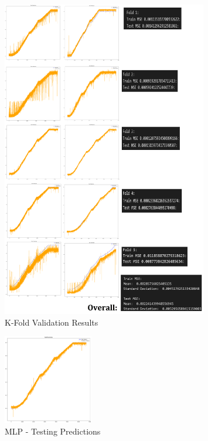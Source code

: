 \documentclass[conference]{IEEEtran}
\begin{document}
{        \begin{figure}[!h]
            \centering
            \includegraphics[width=0.8\textwidth]{../Data_Mining_Images/K_Fold_Results.png}
            \caption{K-Fold Validation Results} \label{fig_10}
        \end{figure}

\newpage
		\begin{figure}[!h]
	            \centering
	            \includegraphics[width=0.35\textwidth]{../Data_Mining_Images/Test_Predictions.png}
	            \caption{MLP - Testing Predictions} \label{fig_9}
	    \end{figure}


}
\end{document}
